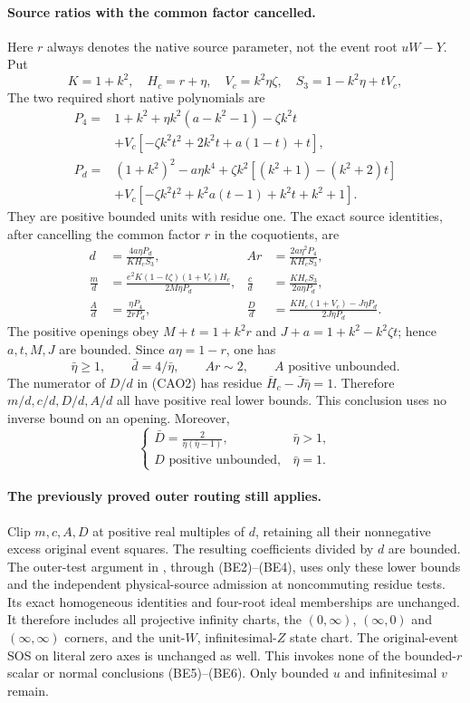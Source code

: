 \paragraph{Source ratios with the common factor cancelled.}
Here $r$ always denotes the native source parameter, not the event root
$uW-Y$. Put
\[
 K=1+k^2,\quad H_c=r+\eta,\quad V_c=k^2\eta\zeta,\quad
 S_3=1-k^2\eta+tV_c,
\]
The two required short native polynomials are
\begin{align*}
P_4={}&1+k^2+\eta k^2(a-k^2-1)-\zeta k^2t\\
 &+V_c[-\zeta k^2t^2+2k^2t+a(1-t)+t],\\
P_d={}&(1+k^2)^2-a\eta k^4
 +\zeta k^2[(k^2+1)-(k^2+2)t]\\
 &+V_c[-\zeta k^2t^2+k^2a(t-1)+k^2t+k^2+1].
\end{align*}
They are positive bounded units with residue one. The exact source
identities, after cancelling the common factor $r$ in the coquotients,
are
\begin{align*}
 d&=\frac{4a\eta P_d}{KH_cS_3},&
 Ar&=\frac{2a\eta^2P_4}{KH_cS_3},\\
 \frac md&=\frac{e^2K(1-t\zeta)(1+V_c)H_c}{2M\eta P_d},&
 \frac cd&=\frac{KH_cS_3}{2a\eta P_d},\\
 \frac Ad&=\frac{\eta P_4}{2rP_d},&
 \frac Dd&=\frac{KH_c(1+V_c)-J\eta P_d}{2J\eta P_d}.
 \tag{CAO2}
\end{align*}
The positive openings obey
$M+t=1+k^2r$ and $J+a=1+k^2-k^2\zeta t$; hence $a,t,M,J$ are
bounded. Since $a\eta=1-r$, one has
\[
 \bar\eta\ge1,\qquad \bar d=4/\bar\eta,\qquad Ar\sim2,
 \qquad A\text{ positive unbounded}.
 \tag{CAO3}
\]
The numerator of $D/d$ in (CAO2) has residue
$\bar H_c-\bar J\bar\eta=1$. Therefore $m/d,c/d,D/d,A/d$ all have
positive real lower bounds. This conclusion uses no inverse bound on
an opening. Moreover,
\[
 \begin{cases}
 \displaystyle \bar D=\frac{2}{\bar\eta(\bar\eta-1)},
       &\bar\eta>1,\\[4pt]
 D\text{ positive unbounded},&\bar\eta=1.
 \end{cases}
 \tag{CAO4}
\]

\paragraph{The previously proved outer routing still applies.}
Clip $m,c,A,D$ at positive real multiples of $d$, retaining all their
nonnegative excess original event squares. The resulting coefficients
divided by $d$ are bounded. The outer-test argument in
, through (BE2)--(BE4), uses only
these lower bounds and the independent physical-source admission at
noncommuting residue tests. Its exact homogeneous identities and
four-root ideal memberships are unchanged. It therefore includes all
projective infinity charts, the $(0,\infty)$, $(\infty,0)$ and
$(\infty,\infty)$ corners, and the unit-$W$, infinitesimal-$Z$ state
chart. The original-event SOS on literal zero axes is unchanged as
well. This invokes none of the bounded-$r$ scalar or normal conclusions
(BE5)--(BE6). Only bounded $u$ and infinitesimal $v$ remain.

